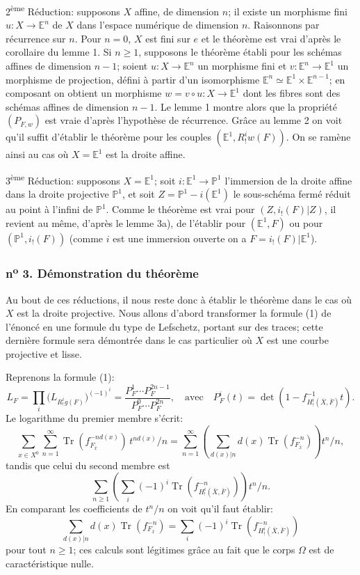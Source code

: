 \documentclass[11pt]{article}
\providecommand{\Tr}{\operatorname{Tr}}
\providecommand{\Tr}{\operatorname{Tr}}
\providecommand{\Tr}{\operatorname{Tr}}
\providecommand{\Tr}{\operatorname{Tr}}
\providecommand{\Tr}{\operatorname{Tr}}
\begin{document}
2\textsuperscript{ème} Réduction: supposons $X$ affine, de dimension $n$; il existe un morphisme fini $u:X\to\mathbb E^n$ de $X$ dans l'espace numérique de dimension $n$. Raisonnons par récurrence sur $n$. Pour $n=0$, $X$ est fini sur $e$ et le théorème est vrai d'après le corollaire du lemme 1. Si $n\ge1$, supposons le théorème établi pour les schémas affines de dimension $n-1$; soient $u:X\to\mathbb E^n$ un morphisme fini et $v:\mathbb E^n\to\mathbb E^1$ un morphisme de projection, défini à partir d'un isomorphisme $\mathbb E^n\simeq\mathbb E^1\times\mathbb E^{n-1}$; en composant on obtient un morphisme $w=v\circ u:X\to\mathbb E^1$ dont les fibres sont des schémas affines de dimension $n-1$. Le lemme 1 montre alors que la propriété $(P_{F,w})$ est vraie d'après l'hypothèse de récurrence. Grâce au lemme 2 on voit qu'il suffit d'établir le théorème pour les couples $(\mathbb E^1,R^i_!w(F))$. On se ramène ainsi au cas où $X=\mathbb E^1$ est la droite affine.

3\textsuperscript{ème} Réduction: supposons $X=\mathbb E^1$; soit $i:\mathbb E^1\to\mathbb P^1$ l'immersion de la droite affine dans la droite projective $\mathbb P^1$, et soit $Z=\mathbb P^1-i(\mathbb E^1)$ le sous-schéma fermé réduit au point à l'infini de $\mathbb P^1$. Comme le théorème est vrai pour $(Z,i_!(F)|Z)$, il revient au même, d'après le lemme 3a), de l'établir pour $(\mathbb E^1,F)$ ou pour $(\mathbb P^1,i_!(F))$ (comme $i$ est une immersion ouverte on a $F=i_!(F)|\mathbb E^1$).

\subsubsection*{n\textsuperscript{o} 3. Démonstration du théorème}

Au bout de ces réductions, il nous reste donc à établir le théorème dans le cas où $X$ est la droite projective. Nous allons d'abord transformer la formule (1) de l'énoncé en une formule du type de Lefschetz, portant sur des traces; cette dernière formule sera démontrée dans le cas particulier où $X$ est une courbe projective et lisse.

Reprenons la formule (1):
\[
L_F=\prod_i\bigl(L_{R^i_!g(F)}\bigr)^{(-1)^i}
=\frac{P_F^1\cdots P_F^{2n-1}}{P_F^0\cdots P_F^{2n}},
\quad\text{avec}\quad
P_F^i(t)=\det(1-f^{-1}_{H^i_!(\bar X,\bar F)}t).
\]
Le logarithme du premier membre s'écrit:
\[
\sum_{x\in X^0}\sum_{n=1}^{\infty}\Tr(f_{F_{\bar x}}^{-n d(x)})\,t^{n d(x)}/n
=\sum_{n=1}^{\infty}\left(\sum_{d(x)|n} d(x)\Tr(f_{F_{\bar x}}^{-n})\right)t^n/n,
\]
tandis que celui du second membre est
\[
\sum_{n\ge1}\left(\sum_i(-1)^i\Tr(f^{-n}_{H^i_!(\bar X,\bar F)})\right)t^n/n.
\]
En comparant les coefficients de $t^n/n$ on voit qu'il faut établir:
\[
\sum_{d(x)|n}d(x)\Tr(f_{F_{\bar x}}^{-n})
=\sum_i(-1)^i\Tr(f^{-n}_{H^i_!(\bar X,\bar F)})
\tag{2}
\]
pour tout $n\ge1$; ces calculs sont légitimes grâce au fait que le corps $\Omega$ est de caractéristique nulle.
\end{document}
